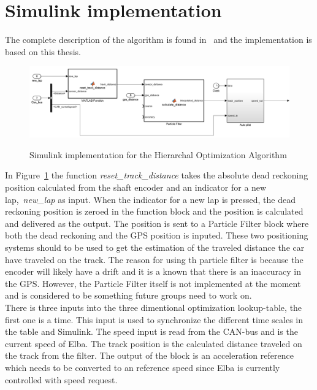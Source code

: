 \section{Simulink implementation}
The complete description of the algorithm is found in~\cite{liu2016} and the
implementation is based on this thesis.
\begin{figure}[H]
    \centering\label{fig:optimization_cont}
    \includegraphics[width=\textwidth]{./img/optimization_cont.png}
    \caption{Simulink implementation for the Hierarchal Optimization Algorithm}
\end{figure}
In Figure~\ref{fig:optimization_cont} the function
\textit{reset\_track\_distance} takes the absolute dead reckoning position
calculated from the shaft encoder and an indicator for a new
lap,~\textit{new\_lap} as input. When the indicator for a new lap is pressed,
the dead reckoning position is zeroed in the function block and the position is
calculated and delivered as the output. The position is sent to a Particle
Filter block where both the dead reckoning and the GPS position is inputed.
These two positioning systems should to be used to get the estimation of
the traveled distance the car have traveled on the track. The reason for using
th particle filter is because the encoder will likely have a drift and it is
a known that there is an inaccuracy in the GPS. However, the
Particle Filter itself is not implemented at the moment and is considered to be
something future groups need to work on.\\
There is three inputs into the three dimentional optimization lookup-table, the first one is a
time. This input is used to synchronize the different time scales in the table and
Simulink. The speed input is read from the CAN-bus and is the current speed of
Elba. The track position is the calculated distance traveled on the track from
the filter. The output of the block is an acceleration reference which needs to
be converted to an reference speed since Elba is currently controlled with speed
request. 

